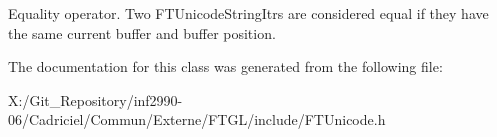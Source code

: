Equality operator. Two F\-T\-Unicode\-String\-Itrs are considered equal if they have the same current buffer and buffer position. 

The documentation for this class was generated from the following file\-:\begin{DoxyCompactItemize}
\item 
X\-:/\-Git\-\_\-\-Repository/inf2990-\/06/\-Cadriciel/\-Commun/\-Externe/\-F\-T\-G\-L/include/F\-T\-Unicode.\-h\end{DoxyCompactItemize}
